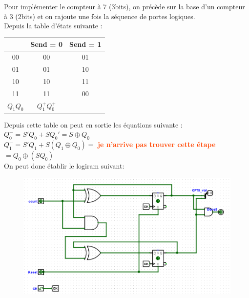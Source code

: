 \documentclass[a4paper]{article} %
\newcommand{\red}[1]{\textbf{\textcolor{OrangeRed}{#1}}}
\begin{document}
\begin{tcolorbox}[colframe=Monokaimagenta,colback=white, breakable, enhanced]
Pour implémenter le compteur à 7 (3bits), on précède sur la base d'un compteur à 3 (2bits) et on rajoute une fois la séquence de portes logiques.\\
Depuis la table d'états suivante :
\begin{center}
	\begin{tabular}{c|c|c}
			& 	Send = 0 &	Send = 1\\ \hline 
		00	&	00		 & 01 \\
		01	&	01	     & 10 \\
		10	&	10       & 11 \\
		11	&	11 		 & 00 \\
		$Q_1Q_0$&$Q_1^+Q_0^+$&\\
	\end{tabular}
\end{center}
Depuis cette table on peut en sortie les équations suivante : \\
$Q_0^+ = S'Q_0 + S Q_0' = S \oplus Q_0$\\
$Q_1^+ = S'Q_1+S(Q_1\oplus Q_0) = $ \red{je n'arrive pas trouver cette étape} $= Q_0 \oplus (SQ_0)$\\

On peut donc établir le logiram suivant:
\begin{figure}[H]
	\centering
	\includegraphics[width=\textwidth]{src/CPT_03}
	\label{fig:CPT_03}
\end{figure}


\end{tcolorbox}
\end{document}
